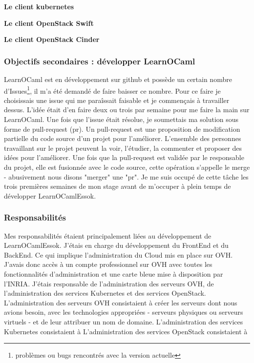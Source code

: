 \documentclass{article}
\begin{document}
\textbf{Le client kubernetes}


\newpage

\textbf{Le client OpenStack Swift}


\newpage

\textbf{Le client OpenStack Cinder}


\newpage


\subsubsection{Objectifs secondaires : développer LearnOCaml}

LearnOCaml est en développement sur github et possède un certain nombre d'Issues\footnote{\label{Issues} problèmes ou bugs rencontrés avec la version actuelle}, il m'a été demandé de faire baisser ce nombre.
\newline
Pour ce faire je choisissais une issue qui me paraîssait faisable et je commençais à travailler dessus. L'idée était d'en faire deux ou trois par semaine pour me faire la main sur LearnOCaml.
\newline
Une fois que l'issue était résolue, je soumettais ma solution sous forme de pull-request (pr). Un pull-request est une proposition de modification partielle du code source d'un projet pour l'améliorer. L'ensemble des personnes travaillant sur le projet peuvent la voir, l'étudier, la commenter et proposer des idées pour l'améliorer. Une fois que la pull-request est validée par le responsable du projet, elle est fusionnée avec le code source, cette opération s'appelle le merge - abusivement nous disons "merger" une "pr".
\newline
Je me suis occupé de cette tâche les trois premières semaines de mon stage avant de m'occuper à plein temps de développer LearnOCamlEssok.

\subsubsection{Responsabilités}

Mes responsabilités étaient principalement liées au développement de LearnOCamlEssok. J'étais en charge du développement du FrontEnd et du BackEnd. Ce qui implique l'administration du Cloud mis en place sur OVH.
\newline
J'avais donc accès à un compte professionnel sur OVH avec toutes les fonctionnalités d'administration et une carte bleue mise à disposition par l'INRIA. J'étais responsable de l'administration des serveurs OVH, de l'administration des services Kubernetes et des services OpenStack.
\newline
L'administration des serveurs OVH consistaient à créer les serveurs dont nous avions besoin, avec les technologies appropriées - serveurs physiques ou serveurs virtuels - et de leur attribuer un nom de domaine.
\newline
L'administration des services Kubernetes consistaient à 
\newline
L'administration des services OpenStack consistaient à 
\end{document}
